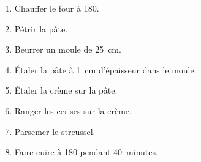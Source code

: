 \begin{recipe}
  \begin{enumerate}

  \item Chauffer le four à 180\C.

  \item Pétrir la pâte.

  \item Beurrer un moule de 25~cm.

  \item Étaler la pâte à 1~cm d'épaisseur dans le moule.

  \item Étaler la crème sur la pâte.

  \item Ranger les cerises sur la crème.

  \item Parsemer le streussel.

  \item Faire cuire à 180\C{} pendant{} 40~minutes.

  \end{enumerate}
\end{recipe}

